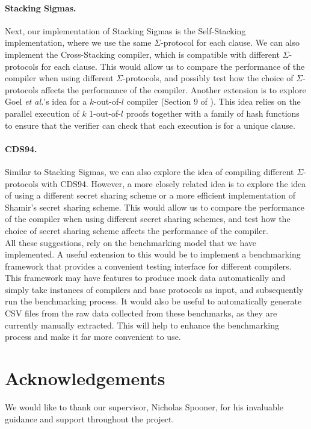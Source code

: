 \paragraph{Stacking Sigmas.} Next, our implementation of Stacking Sigmas is the Self-Stacking 
implementation, where we use the same $\Sigma$-protocol for each clause. We can also implement
the Cross-Stacking compiler, which is compatible with different $\Sigma$-protocols for each clause.
This would allow us to compare the performance of the compiler when using different $\Sigma$-protocols, 
and possibly test how the choice of $\Sigma$-protocols affects the performance of the compiler. Another 
extension is to explore Goel {\em et al.}'s idea for a $k$-out-of-$l$ compiler (Section 9 of \cite{StackingSigmas}).
This idea relies on the parallel execution of $k$ 1-out-of-$l$ proofs together with a family of hash functions to 
ensure that the verifier can check that each execution is for a unique clause. 

\paragraph{CDS94.} Similar to Stacking Sigmas, we can also explore the idea of compiling different $\Sigma$-protocols
with CDS94. However, a more closely related idea is to explore the idea of using a different secret sharing scheme or 
a more efficient implementation of Shamir's secret sharing scheme. This would allow us to compare the performance of
the compiler when using different secret sharing schemes, and test how the choice of secret sharing scheme
affects the performance of the compiler. \\

All these suggestions, rely on the benchmarking model that we have implemented. A useful extension to this would be to 
implement a benchmarking framework that provides a convenient testing interface for different compilers. This framework 
may have features to produce mock data automatically and simply take instances of compilers and base protocols as input, 
and subsequently run the benchmarking process. It would also be useful to automatically generate CSV files from 
the raw data collected from these benchmarks, as they are currently manually extracted. This will help to enhance 
the benchmarking process and make it far more convenient to use. 

\section{Acknowledgements}
\label{sec:acknowledgements}
We would like to thank our supervisor, Nicholas Spooner, for his invaluable guidance and support throughout the project.
